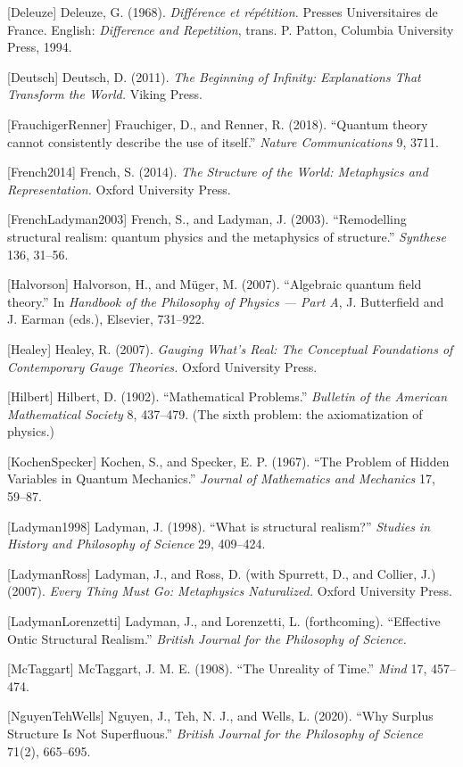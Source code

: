 \documentclass[
]{article}
\begin{document}
{[}Deleuze{]} Deleuze, G. (1968). \emph{Différence et répétition.}
Presses Universitaires de France. English: \emph{Difference and
Repetition}, trans. P. Patton, Columbia University Press, 1994.

{[}Deutsch{]} Deutsch, D. (2011). \emph{The Beginning of Infinity:
Explanations That Transform the World.} Viking Press.

{[}FrauchigerRenner{]} Frauchiger, D., and Renner, R. (2018). ``Quantum
theory cannot consistently describe the use of itself.'' \emph{Nature
Communications} 9, 3711.

{[}French2014{]} French, S. (2014). \emph{The Structure of the World:
Metaphysics and Representation.} Oxford University Press.

{[}FrenchLadyman2003{]} French, S., and Ladyman, J. (2003).
``Remodelling structural realism: quantum physics and the metaphysics of
structure.'' \emph{Synthese} 136, 31--56.

{[}Halvorson{]} Halvorson, H., and Müger, M. (2007). ``Algebraic quantum
field theory.'' In \emph{Handbook of the Philosophy of Physics --- Part
A}, J. Butterfield and J. Earman (eds.), Elsevier, 731--922.

{[}Healey{]} Healey, R. (2007). \emph{Gauging What's Real: The
Conceptual Foundations of Contemporary Gauge Theories.} Oxford
University Press.

{[}Hilbert{]} Hilbert, D. (1902). ``Mathematical Problems.''
\emph{Bulletin of the American Mathematical Society} 8, 437--479. (The
sixth problem: the axiomatization of physics.)

{[}KochenSpecker{]} Kochen, S., and Specker, E. P. (1967). ``The Problem
of Hidden Variables in Quantum Mechanics.'' \emph{Journal of Mathematics
and Mechanics} 17, 59--87.

{[}Ladyman1998{]} Ladyman, J. (1998). ``What is structural realism?''
\emph{Studies in History and Philosophy of Science} 29, 409--424.

{[}LadymanRoss{]} Ladyman, J., and Ross, D. (with Spurrett, D., and
Collier, J.) (2007). \emph{Every Thing Must Go: Metaphysics
Naturalized.} Oxford University Press.

{[}LadymanLorenzetti{]} Ladyman, J., and Lorenzetti, L. (forthcoming).
``Effective Ontic Structural Realism.'' \emph{British Journal for the
Philosophy of Science.}

{[}McTaggart{]} McTaggart, J. M. E. (1908). ``The Unreality of Time.''
\emph{Mind} 17, 457--474.

{[}NguyenTehWells{]} Nguyen, J., Teh, N. J., and Wells, L. (2020). ``Why
Surplus Structure Is Not Superfluous.'' \emph{British Journal for the
Philosophy of Science} 71(2), 665--695.
\end{document}
